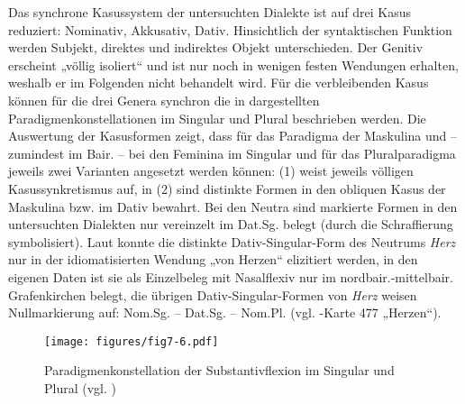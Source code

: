 Das synchrone Kasussystem der untersuchten Dialekte ist auf drei Kasus reduziert: Nominativ, Akkusativ, Dativ. Hinsichtlich der syntaktischen Funktion werden Subjekt, direktes und indirektes Objekt unterschieden. Der Genitiv erscheint „völlig isoliert“ \citep[90]{Rowley1997} und ist nur noch in wenigen festen Wendungen erhalten, weshalb er im Folgenden nicht behandelt wird. Für die verbleibenden Kasus können für die drei Genera synchron die in   dargestellten Paradigmenkonstellationen im Singular und Plural beschrieben werden. Die Auswertung der Kasusformen zeigt, dass für das Paradigma der Maskulina und -- zumindest im Bair. -- bei den Feminina im Singular und für das Pluralparadigma jeweils zwei Varianten angesetzt werden können: (1) weist jeweils völligen Kasussynkretismus auf, in (2) sind distinkte Formen in den obliquen Kasus der Maskulina bzw. im Dativ bewahrt. Bei den Neutra sind markierte Formen in den untersuchten Dialekten nur vereinzelt im Dat.Sg. belegt (durch die Schraffierung symbolisiert). Laut \citet[88]{Rowley1997} konnte die distinkte Dativ-Singular-Form des Neutrums \textit{Herz} nur in der idiomatisierten Wendung „von Herzen“ elizitiert werden, in den eigenen Daten ist sie als Einzelbeleg mit Nasalflexiv nur im nordbair.-mittelbair. Grafenkirchen belegt, die übrigen Dativ-Singular-Formen von \textit{Herz} weisen Nullmarkierung auf: Nom.Sg.  -- Dat.Sg.   -- Nom.Pl.  (vgl. \citealt{WA}-Karte 477 „Herzen“).


\begin{figure}%
\texttt{[image: figures/fig7-6.pdf]}
\caption{Paradigmenkonstellation der Substantivflexion im Singular und Plural (vgl. \citealt[88]{Rowley1997})}
\label{fig:8}
\end{figure}

